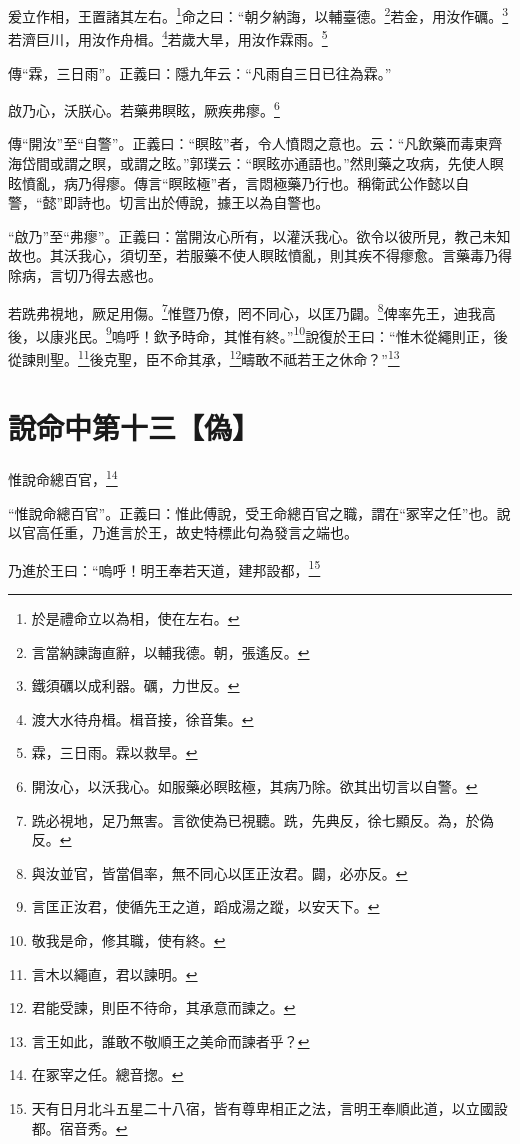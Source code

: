 爰立作相，王置諸其左右。\footnote{於是禮命立以為相，使在左右。}命之曰：“朝夕納誨，以輔臺德。\footnote{言當納諫誨直辭，以輔我德。朝，張遙反。}若金，用汝作礪。\footnote{鐵須礪以成利器。礪，力世反。}若濟巨川，用汝作舟楫。\footnote{渡大水待舟楫。楫音接，徐音集。}若歲大旱，用汝作霖雨。\footnote{霖，三日雨。霖以救旱。}

{\noindent\zhuan{}\fzbyks 傳“霖，三日雨”。正義曰：隱九年云：“凡雨自三日已往為霖。” \par}

啟乃心，沃朕心。若藥弗瞑眩，厥疾弗瘳。\footnote{開汝心，以沃我心。如服藥必瞑眩極，其病乃除。欲其出切言以自警。}


{\noindent\zhuan{}\fzbyks 傳“開汝”至“自警”。正義曰：“瞑眩”者，令人憤悶之意也。云：“凡飲藥而毒東齊海岱間或謂之瞑，或謂之眩。”郭璞云：“瞑眩亦通語也。”然則藥之攻病，先使人瞑眩憤亂，病乃得瘳。傳言“瞑眩極”者，言悶極藥乃行也。稱衛武公作懿以自警，“懿”即詩也。切言出於傅說，據王以為自警也。 \par}

{\noindent\shu{}\fzkt “啟乃”至“弗瘳”。正義曰：當開汝心所有，以灌沃我心。欲令以彼所見，教己未知故也。其沃我心，須切至，若服藥不使人瞑眩憤亂，則其疾不得瘳愈。言藥毒乃得除病，言切乃得去惑也。 \par}

若跣弗視地，厥足用傷。\footnote{跣必視地，足乃無害。言欲使為已視聽。跣，先典反，徐七顯反。為，於偽反。}惟暨乃僚，罔不同心，以匡乃闢。\footnote{與汝並官，皆當倡率，無不同心以匡正汝君。闢，必亦反。}俾率先王，迪我高後，以康兆民。\footnote{言匡正汝君，使循先王之道，蹈成湯之蹤，以安天下。}嗚呼！欽予時命，其惟有終。”\footnote{敬我是命，修其職，使有終。}說復於王曰：“惟木從繩則正，後從諫則聖。\footnote{言木以繩直，君以諫明。}後克聖，臣不命其承，\footnote{君能受諫，則臣不待命，其承意而諫之。}疇敢不祗若王之休命？”\footnote{言王如此，誰敢不敬順王之美命而諫者乎？}

\section{說命中第十三【偽】}

惟說命總百官，\footnote{在冢宰之任。總音揔。}

{\noindent\shu{}\fzkt “惟說命總百官”。正義曰：惟此傅說，受王命總百官之職，謂在“冢宰之任”也。說以官高任重，乃進言於王，故史特標此句為發言之端也。 \par}

乃進於王曰：“嗚呼！明王奉若天道，建邦設都，\footnote{天有日月北斗五星二十八宿，皆有尊卑相正之法，言明王奉順此道，以立國設都。宿音秀。}

